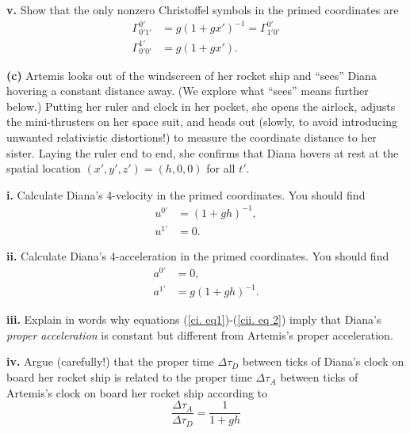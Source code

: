\documentclass[a4paper]{article} %
\begin{document}
\begin{framed}
\textbf{v.} Show that the only nonzero Christoffel symbols in the primed coordinates are
\begin{align}
\Gamma^{0'}_{0'1'}&=g(1+gx')^{-1}=\Gamma^{0'}_{1'0'}\\
\Gamma^{1'}_{0'0'}&=g(1+gx').
\end{align}
\end{framed}

\begin{framed}
\textbf{(c)} Artemis looks out of the windscreen of her rocket ship and “sees” Diana hovering a constant distance away. (We explore what “sees” means further below.) Putting her ruler and clock in her pocket, she opens the airlock, adjusts the mini-thrusters on her space suit, and heads out (slowly, to avoid introducing unwanted relativistic distortions!) to measure the coordinate distance to her sister. Laying the ruler end to end, she confirms that Diana hovers at rest at the spatial location $(x',y',z')=(h,0,0)$ for all $t'$.
\end{framed}

\begin{framed}
\textbf{i.} Calculate Diana’s 4-velocity in the primed coordinates. You should find
\begin{align}
u^{0'}&=(1+gh)^{-1},\label{ci. eq1}\\
u^{1'}&=0.
\end{align}
\end{framed}

\begin{framed}
\textbf{ii.} Calculate Diana’s 4-acceleration in the primed coordinates. You should find
\begin{align}
a^{0'}&=0,\\
a^{1'}&=g(1+gh)^{-1}.\label{cii. eq 2}
\end{align}
\end{framed}

\begin{framed}
\textbf{iii.} Explain in words why equations (\ref{ci. eq1})-(\ref{cii. eq 2}) imply that Diana's \emph{proper acceleration} is constant but different from Artemis’s proper acceleration.
\end{framed}

\begin{framed}
\textbf{iv.} Argue (carefully!) that the proper time $\Delta\tau_D$ between ticks of Diana’s clock on board her rocket ship is related to the proper time $\Delta\tau_A$ between ticks of Artemis’s clock on board her rocket ship according to
\begin{equation}
\frac{\Delta\tau_A}{\Delta\tau_D}=\frac{1}{1+gh}
\end{equation}
\end{framed}
\end{document}
